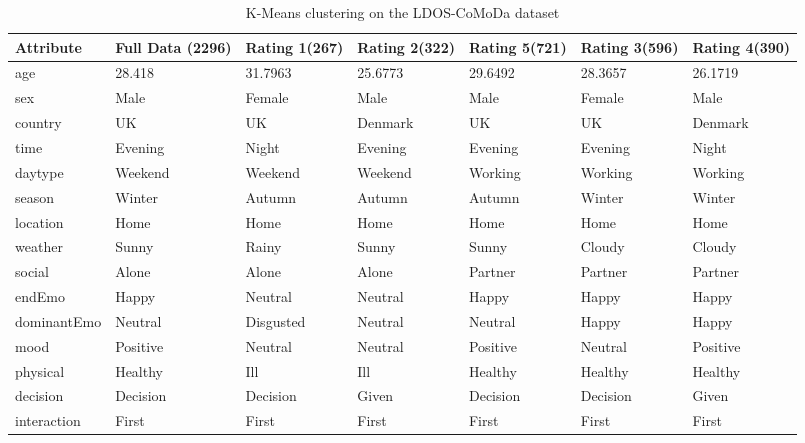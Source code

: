 \documentclass{article}
\begin{document}
\begin{table}[t]
\label{kmeans}
\begin{tiny}
\begin{tabular}{p{1.4cm} p{0.9cm} p{0.9cm} p{0.9cm} p{0.9cm} p{0.9cm} p{0.9cm}}
\hline
\abovespace\belowspace
Attribute & Full Data (2296) & Rating 1(267) & Rating 2(322) & Rating 5(721) & Rating 3(596) &  Rating 4(390) \\
\hline
\abovespace
age         &  28.418  & 31.7963  & 25.6773 & 29.6492  & 28.3657  & 26.1719 \\
sex         &    Male  & Female   & Male    & Male     & Female   & Male    \\
country     &      UK  & UK       & Denmark & UK       & UK       & Denmark \\
time        & Evening  & Night    & Evening & Evening  & Evening  & Night   \\
daytype     & Weekend  & Weekend  & Weekend & Working  & Working  & Working \\
season      &  Winter  & Autumn   & Autumn  & Autumn   & Winter   & Winter  \\
location    &    Home  & Home     & Home    & Home     & Home     & Home       \\
weather     &   Sunny  & Rainy    & Sunny   & Sunny    & Cloudy   & Cloudy     \\
social      &   Alone  & Alone    & Alone   & Partner  & Partner   & Partner    \\
endEmo      &   Happy  & Neutral  & Neutral & Happy    & Happy  & Happy    \\
dominantEmo & Neutral  & Disgusted & Neutral & Neutral & Happy    & Happy    \\
mood        & Positive & Neutral  & Neutral & Positive & Neutral  & Positive   \\
physical    & Healthy  & Ill  & Ill & Healthy  & Healthy  & Healthy    \\
decision    & Decision & Decision & Given   & Decision & Decision & Given      \\
\belowspace
interaction & First    & First    & First   & First    & First    & First      \\
\hline
\end{tabular}
\end{tiny}
\caption{K-Means clustering on the LDOS-CoMoDa dataset}
\end{table}
\end{document}
